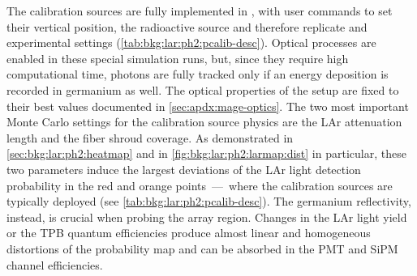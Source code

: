 The calibration sources are fully implemented in \mage, with user commands to set their
vertical position, the radioactive source and therefore replicate  and 
experimental settings (\cref{tab:bkg:lar:ph2:pcalib-desc}). Optical
processes are enabled in these special simulation runs, but, since they require high
computational time, photons are fully tracked only if an energy deposition is recorded in
germanium as well. The optical properties of the setup are fixed to their best values
documented in \cref{sec:apdx:mage-optics}. The two most important Monte Carlo settings
for the calibration source physics are the LAr attenuation length and the fiber shroud
coverage. As demonstrated in \cref{sec:bkg:lar:ph2:heatmap} and in
\cref{fig:bkg:lar:ph2:larmap:dist} in particular, these two parameters induce the largest
deviations of the LAr light detection probability in the red and orange points~---~where the
calibration sources are typically deployed (see \cref{tab:bkg:lar:ph2:pcalib-desc}). The
germanium reflectivity, instead, is crucial when probing the array region. Changes in the
LAr light yield or the TPB quantum efficiencies produce almost linear and homogeneous
distortions of the probability map and can be absorbed in the PMT and SiPM channel
efficiencies.

